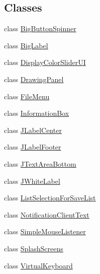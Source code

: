 \subsection*{Classes}
\begin{DoxyCompactItemize}
\item 
class \hyperlink{classgov_1_1fnal_1_1ppd_1_1dd_1_1util_1_1guiUtils_1_1BigButtonSpinner}{Big\-Button\-Spinner}
\item 
class \hyperlink{classgov_1_1fnal_1_1ppd_1_1dd_1_1util_1_1guiUtils_1_1BigLabel}{Big\-Label}
\item 
class \hyperlink{classgov_1_1fnal_1_1ppd_1_1dd_1_1util_1_1guiUtils_1_1DisplayColorSliderUI}{Display\-Color\-Slider\-U\-I}
\item 
class \hyperlink{classgov_1_1fnal_1_1ppd_1_1dd_1_1util_1_1guiUtils_1_1DrawingPanel}{Drawing\-Panel}
\item 
class \hyperlink{classgov_1_1fnal_1_1ppd_1_1dd_1_1util_1_1guiUtils_1_1FileMenu}{File\-Menu}
\item 
class \hyperlink{classgov_1_1fnal_1_1ppd_1_1dd_1_1util_1_1guiUtils_1_1InformationBox}{Information\-Box}
\item 
class \hyperlink{classgov_1_1fnal_1_1ppd_1_1dd_1_1util_1_1guiUtils_1_1JLabelCenter}{J\-Label\-Center}
\item 
class \hyperlink{classgov_1_1fnal_1_1ppd_1_1dd_1_1util_1_1guiUtils_1_1JLabelFooter}{J\-Label\-Footer}
\item 
class \hyperlink{classgov_1_1fnal_1_1ppd_1_1dd_1_1util_1_1guiUtils_1_1JTextAreaBottom}{J\-Text\-Area\-Bottom}
\item 
class \hyperlink{classgov_1_1fnal_1_1ppd_1_1dd_1_1util_1_1guiUtils_1_1JWhiteLabel}{J\-White\-Label}
\item 
class \hyperlink{classgov_1_1fnal_1_1ppd_1_1dd_1_1util_1_1guiUtils_1_1ListSelectionForSaveList}{List\-Selection\-For\-Save\-List}
\item 
class \hyperlink{classgov_1_1fnal_1_1ppd_1_1dd_1_1util_1_1guiUtils_1_1NotificationClientText}{Notification\-Client\-Text}
\item 
class \hyperlink{classgov_1_1fnal_1_1ppd_1_1dd_1_1util_1_1guiUtils_1_1SimpleMouseListener}{Simple\-Mouse\-Listener}
\item 
class \hyperlink{classgov_1_1fnal_1_1ppd_1_1dd_1_1util_1_1guiUtils_1_1SplashScreens}{Splash\-Screens}
\item 
class \hyperlink{classgov_1_1fnal_1_1ppd_1_1dd_1_1util_1_1guiUtils_1_1VirtualKeyboard}{Virtual\-Keyboard}
\end{DoxyCompactItemize}
